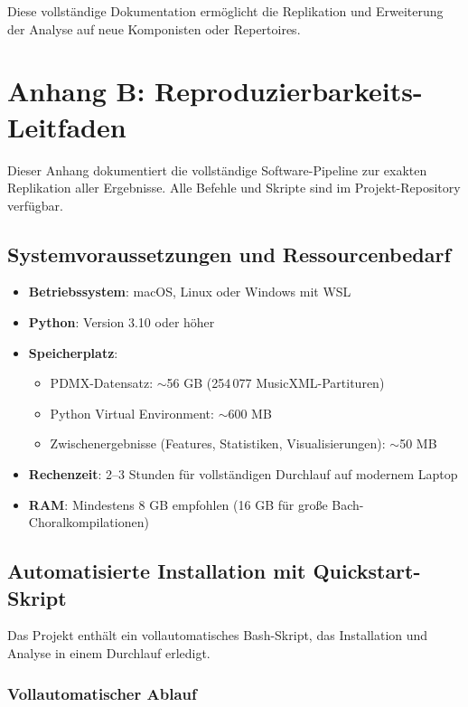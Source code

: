 \documentclass[12pt,a4paper]{article}
\theoremstyle{definition}
\begin{document}
Diese vollständige Dokumentation ermöglicht die Replikation und Erweiterung der Analyse auf neue Komponisten oder Repertoires.

\section{Anhang B: Reproduzierbarkeits-Leitfaden}

Dieser Anhang dokumentiert die vollständige Software-Pipeline zur exakten Replikation aller Ergebnisse. Alle Befehle und Skripte sind im Projekt-Repository verfügbar.

\subsection{Systemvoraussetzungen und Ressourcenbedarf}

\begin{itemize}
    \item \textbf{Betriebssystem}: macOS, Linux oder Windows mit WSL
    \item \textbf{Python}: Version 3.10 oder höher
    \item \textbf{Speicherplatz}: 
    \begin{itemize}
        \item PDMX-Datensatz: $\sim$56 GB (254\,077 MusicXML-Partituren)
        \item Python Virtual Environment: $\sim$600 MB
        \item Zwischenergebnisse (Features, Statistiken, Visualisierungen): $\sim$50 MB
    \end{itemize}
    \item \textbf{Rechenzeit}: 2--3 Stunden für vollständigen Durchlauf auf modernem Laptop
    \item \textbf{RAM}: Mindestens 8 GB empfohlen (16 GB für große Bach-Choralkompilationen)
\end{itemize}

\subsection{Automatisierte Installation mit Quickstart-Skript}

Das Projekt enthält ein vollautomatisches Bash-Skript, das Installation und Analyse in einem Durchlauf erledigt.

\subsubsection{Vollautomatischer Ablauf}
\end{document}
